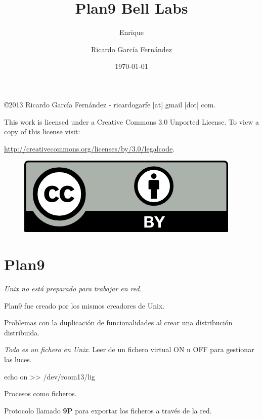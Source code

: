 \documentclass[11pt]{scrartcl}
\title{\textbf{Plan9 Bell Labs}}
\subtitle{Enrique}
\author{Ricardo Garc\'ia Fern\'andez}
\date{\today}
\begin{document}
\maketitle

\vfill

\begin{flushright}
    \copyright  2013 Ricardo Garc\'ia Fern\'andez - ricardogarfe [at] gmail [dot] com.

    This work is licensed under a Creative Commons 3.0 Unported License.
    To view a copy of this license visit:
 
    \url{http://creativecommons.org/licenses/by/3.0/legalcode}.
\end{flushright}

\begin{figure}[h]
    \begin{flushright}	
        \includegraphics{by}
        \label{fig:by}
    \end{flushright}
\end{figure}

\newpage

\section{Plan9}

\emph{Unix no está preparado para trabajar en red.}

\par Plan9 fue creado por los mismos creadores de Unix.

\par Problemas con la duplicación de funcionalidades al crear una distribución distribuida.

\emph{Todo es un fichero en Unix}. Leer de un fichero virtual ON u OFF para gestionar las luces.

    echo on >> /dev/room13/lig

\par Procesos como ficheros.

\par Protocolo llamado \textbf{9P} para exportar los ficheros a través de la red.
\end{document}
